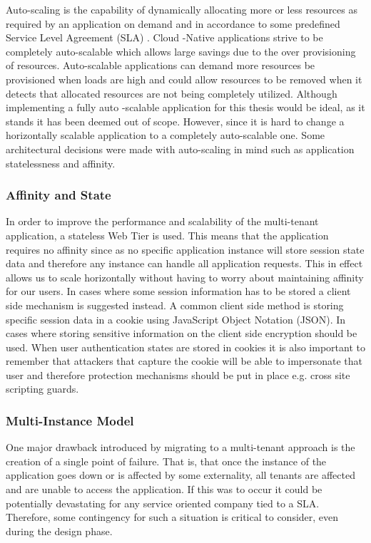Auto-scaling is the capability of dynamically allocating more or less resources as required by an application on demand and in accordance to some predefined Service Level Agreement (SLA) \cite{Homer2014}. Cloud -Native applications strive to be completely auto-scalable which allows large savings due to the over provisioning of resources. Auto-scalable applications can demand more resources be provisioned when loads are high and could allow resources to be removed when it detects that allocated resources are not being completely utilized. Although implementing a fully auto -scalable application for this thesis would be ideal, as it stands it has been deemed out of scope. However, since it is hard to change a horizontally scalable application to a completely auto-scalable one. Some architectural decisions were made with auto-scaling in mind such as application statelessness and affinity.


\subsubsection{Affinity and State}

In order to improve the performance and scalability of the multi-tenant application, a stateless Web Tier is used. This means that the application requires no affinity since as no specific application instance will store session state data and therefore any instance can handle all application requests. This in effect allows us to scale horizontally without having to worry about maintaining affinity for our users. In cases where some session information has to be stored a client side mechanism is suggested instead. A common client side method is storing specific session data in a cookie using JavaScript Object Notation (JSON). In cases where storing sensitive information on the client side encryption should be used. When user authentication states are stored in cookies it is also important to remember that attackers that capture the cookie will be able to impersonate that user and therefore protection mechanisms should be put in place e.g. cross site scripting guards.


\subsubsection{Multi-Instance Model}
\label{sec:multiinstance}
One major drawback introduced by migrating to a multi-tenant approach is the creation of a single point of failure. That is, that once the instance of the application goes down or is affected by some externality, all tenants are affected and are unable to access the application. If this was to occur it could be potentially devastating for any service oriented company tied to a SLA. Therefore, some contingency for such a situation is critical to consider, even during the design phase.
 
